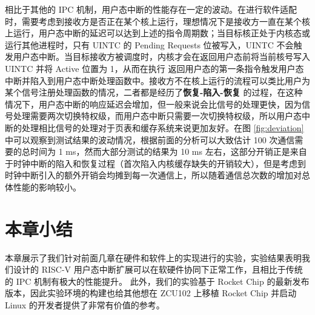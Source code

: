 相比于其他的 IPC 机制，用户态中断的性能存在一定的波动。在进行软件适配时，需要考虑到接收方是否正在某个核上运行，理想情况下是接收方一直在某个核上运行，用户态中断的延迟可以达到上述的指令周期数；当目标核正处于内核态或运行其他进程时，只有 UINTC 的 Pending Requests 位被写入，UINTC 不会触发用户态中断。当目标接收方被调度时，内核才会在返回用户态前将当前核号写入 UINTC 并将 Active 位置为 1，从而在执行 \Isret 返回用户态的第一条指令触发用户态中断并陷入到用户态中断处理函数中。接收方不在核上运行的流程可以类比用户为某个信号注册处理函数的情况，二者都是经历了\textbf{恢复-陷入-恢复} 的过程，在这种情况下，用户态中断的响应延迟会增加，但一般来说会比信号的处理更快，因为信号处理需要两次切换特权级，而用户态中断只需要一次切换特权级，所以用户态中断的处理相比信号的处理对于页表和缓存系统来说更加友好。在图 \ref{fig:deviation} 中可以观察到测试结果的波动情况，根据前面的分析可以大致估计 100 次通信需要的总时间为 1 ms，然而大部分测试的结果为 10 ms 左右，这部分开销正是来自于时钟中断的陷入和恢复过程（首次陷入内核缓存缺失的开销较大），但是考虑到时钟中断引入的额外开销会均摊到每一次通信上，所以随着通信总次数的增加对总体性能的影响较小。

\section{本章小结}

本章展示了我们针对前面几章在硬件和软件上的实现进行的实验，实验结果表明我们设计的 RISC-V 用户态中断扩展可以在软硬件协同下正常工作，且相比于传统的 IPC 机制有极大的性能提升。 此外，我们的实验基于 Rocket Chip 的最新发布版本，因此实验环境的构建也给其他想在 ZCU102 上移植 Rocket Chip 并启动 Linux 的开发者提供了非常有价值的参考。
